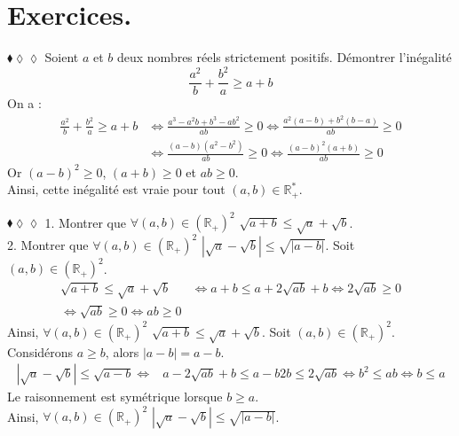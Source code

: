 \documentclass[11pt]{article}
\begin{document}
\section{Exercices.}

\begin{exercice}{$\blacklozenge\lozenge\lozenge$}{}
    Soient $a$ et $b$ deux nombres réels strictement positifs. Démontrer l'inégalité
    \begin{equation*}
        \frac{a^2}{b}+\frac{b^2}{a} \geq a + b
    \end{equation*}
    \tcblower
    On a :
    \begin{align*}
        \frac{a^2}{b}+\frac{b^2}{a} \geq a+b &\iff\frac{a^3-a^2b+b^3-ab^2}{ab}\geq0\iff\frac{a^2(a-b)+b^2(b-a)}{ab}\geq0 \\
        &\iff\frac{(a-b)(a^2-b^2)}{ab}\geq0\iff\frac{(a-b)^2(a+b)}{ab}\geq0
    \end{align*}
    Or $(a-b)^2\geq0$, $(a+b)\geq0$ et $ab\geq0$.\\
    Ainsi, cette inégalité est vraie pour tout $(a,b)\in\mathbb{R}^*_+$.
\end{exercice}

\vspace*{-0.5cm}

\begin{exercice}{$\blacklozenge\lozenge\lozenge$}{}
    1. Montrer que $\forall(a,b)\in(\mathbb{R}_+)^2$ $\sqrt{a+b}\leq\sqrt{a}+\sqrt{b}$.\\
    2. Montrer que $\forall(a,b)\in(\mathbb{R}_+)^2$ $|\sqrt{a}-\sqrt{b}|\leq\sqrt{|a-b|}$.
    \tcblower
     Soit $(a,b)\in(\mathbb{R}_+)^2$.
    \begin{align*}
        \sqrt{a+b}\leq\sqrt{a}+\sqrt{b}&\iff a+b\leq a + 2\sqrt{ab} + b \iff2\sqrt{ab} \geq 0\\
        \iff \sqrt{ab} \geq 0\iff ab \geq 0
    \end{align*}
    Ainsi, $\forall(a,b)\in(\mathbb{R}_+)^2$ $\sqrt{a+b}\leq\sqrt{a}+\sqrt{b}$.\n
     Soit $(a,b)\in(\mathbb{R}_+)^2$.\\
    Considérons $a\geq b$, alors $|a-b| = a-b$.
    \begin{align*}
        |\sqrt{a}-\sqrt{b}|\leq\sqrt{a-b}\iff& a - 2\sqrt{ab} + b \leq a-b 2b \leq 2\sqrt{ab} \iff b^2 \leq ab \iff b \leq a
    \end{align*}
    Le raisonnement est symétrique lorsque $b\geq a$.\\
    Ainsi, $\forall(a,b)\in(\mathbb{R}_+)^2$ $|\sqrt{a}-\sqrt{b}|\leq\sqrt{|a-b|}$.
\end{exercice}
\end{document}
